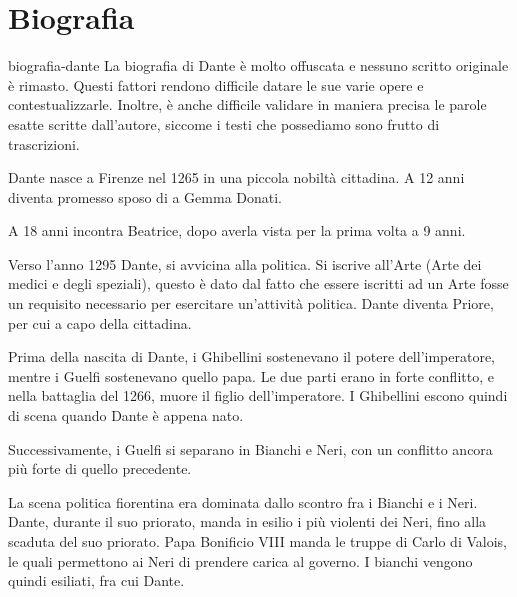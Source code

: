 \documentclass[preview]{standalone}
\begin{document}
\genpage

\section{Biografia}

\begin{snippet}{biografia-dante}
    La biografia di Dante è molto offuscata e nessuno scritto originale è rimasto.
    Questi fattori rendono difficile datare le sue varie opere e contestualizzarle. Inoltre,
    è anche difficile validare in maniera precisa le parole esatte scritte dall'autore, siccome i testi che possediamo
    sono frutto di trascrizioni.
    
    Dante nasce a Firenze nel 1265 in una piccola nobiltà cittadina.
    A 12 anni diventa promesso sposo di a Gemma Donati.
    
    A 18 anni incontra Beatrice, dopo averla vista per la prima volta a 9 anni.
    
    Verso l'anno 1295 Dante, si avvicina alla politica.
    Si iscrive all'Arte (Arte dei medici e degli speziali), questo è dato dal fatto che essere iscritti ad un Arte
    fosse un requisito necessario per esercitare un'attività politica. Dante diventa Priore, per cui a capo della cittadina. %
    
    Prima della nascita di Dante, i Ghibellini sostenevano il potere dell'imperatore, mentre i Guelfi sostenevano quello papa.
    Le due parti erano in forte conflitto, e nella battaglia del 1266, muore il figlio dell'imperatore.
    I Ghibellini escono quindi di scena quando Dante è appena nato.
    
    Successivamente, i Guelfi si separano in Bianchi e Neri, con un conflitto ancora più forte di quello precedente.
    
    La scena politica fiorentina era dominata dallo scontro fra i Bianchi e i Neri.
    Dante, durante il suo priorato, manda in esilio i più violenti dei Neri, fino alla scaduta del suo priorato.
    Papa Bonificio VIII manda le truppe di Carlo di Valois, le quali permettono ai Neri di prendere carica al governo.
    I bianchi vengono quindi esiliati, fra cui Dante.
\end{snippet}
\end{document}
